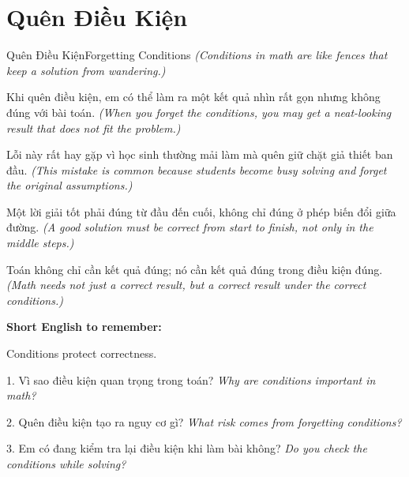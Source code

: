 \section{Quên Điều Kiện}
\begin{truyen}{Quên Điều Kiện}{Forgetting Conditions}
\textit{(Conditions in math are like fences that keep a solution from wandering.)}

Khi quên điều kiện, em có thể làm ra một kết quả nhìn rất gọn nhưng không đúng với bài toán.
\textit{(When you forget the conditions, you may get a neat-looking result that does not fit the problem.)}

Lỗi này rất hay gặp vì học sinh thường mải làm mà quên giữ chặt giả thiết ban đầu.
\textit{(This mistake is common because students become busy solving and forget the original assumptions.)}

Một lời giải tốt phải đúng từ đầu đến cuối, không chỉ đúng ở phép biến đổi giữa đường.
\textit{(A good solution must be correct from start to finish, not only in the middle steps.)}
\end{truyen}

\begin{baihoc}
Toán không chỉ cần kết quả đúng; nó cần kết quả đúng trong điều kiện đúng.
\textit{(Math needs not just a correct result, but a correct result under the correct conditions.)}
\end{baihoc}

\begin{ghinhoanh}
\textbf{Short English to remember:}

Conditions protect correctness.

\end{ghinhoanh}

\begin{tuhocnhanh}
1. Vì sao điều kiện quan trọng trong toán? \textit{Why are conditions important in math?}

2. Quên điều kiện tạo ra nguy cơ gì? \textit{What risk comes from forgetting conditions?}

3. Em có đang kiểm tra lại điều kiện khi làm bài không? \textit{Do you check the conditions while solving?}
\end{tuhocnhanh}
\ngancach

